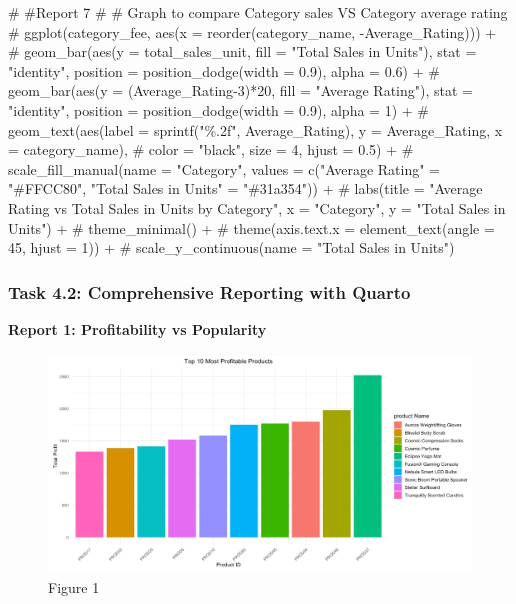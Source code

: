\documentclass[
  letterpaper,
  DIV=11,
  numbers=noendperiod]{scrartcl}
\newenvironment{Shaded}{\begin{snugshade}}{\end{snugshade}}
\newcommand{\CommentTok}[1]{\textcolor[rgb]{0.37,0.37,0.37}{#1}}
\begin{document}
\begin{Shaded}
\begin{Highlighting}[]
\CommentTok{\# \#Report 7}
\CommentTok{\# \# Graph to compare Category sales VS Category average rating}
\CommentTok{\# ggplot(category\_fee, aes(x = reorder(category\_name, {-}Average\_Rating))) +}
\CommentTok{\#   geom\_bar(aes(y = total\_sales\_unit, fill = "Total Sales in Units"), stat = "identity", position = position\_dodge(width = 0.9), alpha = 0.6) +}
\CommentTok{\#   geom\_bar(aes(y = (Average\_Rating{-}3)*20, fill = "Average Rating"), stat = "identity", position = position\_dodge(width = 0.9), alpha = 1) +}
\CommentTok{\#   geom\_text(aes(label = sprintf("\%.2f", Average\_Rating), y = Average\_Rating, x = category\_name), }
\CommentTok{\#             color = "black", size = 4, hjust = 0.5) +}
\CommentTok{\#   scale\_fill\_manual(name = "Category", values = c("Average Rating" = "\#FFCC80", "Total Sales in Units" = "\#31a354")) +}
\CommentTok{\#   labs(title = "Average Rating vs Total Sales in Units by Category", x = "Category", y = "Total Sales in Units") +}
\CommentTok{\#   theme\_minimal() +}
\CommentTok{\#   theme(axis.text.x = element\_text(angle = 45, hjust = 1)) +}
\CommentTok{\#   scale\_y\_continuous(name = "Total Sales in Units")}
\end{Highlighting}
\end{Shaded}

\hypertarget{task-4.2-comprehensive-reporting-with-quarto}{%
\subsubsection{Task 4.2: Comprehensive Reporting with
Quarto}\label{task-4.2-comprehensive-reporting-with-quarto}}

\textbf{Report 1: Profitability vs Popularity}

\begin{figure}

{\centering \includegraphics{images/Figure 1.jpeg}

}

\caption{Figure 1}

\end{figure}
\end{document}
